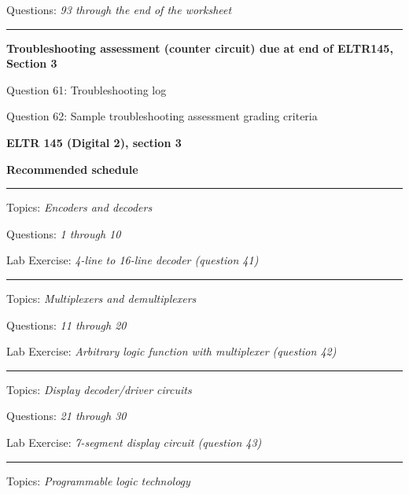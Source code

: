 \hskip 10pt Questions: {\it 93 through the end of the worksheet}
 
\vskip 10pt
\hrule \vskip 5pt
\noindent
{}

\hskip 10pt {\bf Troubleshooting assessment (counter circuit) due at end of ELTR145, Section 3}

\hskip 10pt Question 61: Troubleshooting log
 
\hskip 10pt Question 62: Sample troubleshooting assessment grading criteria
 
\vskip 10pt







\vfil \eject

\centerline{\bf ELTR 145 (Digital 2), section 3} \bigskip 
 
\vskip 10pt

\noindent
{\bf Recommended schedule}

\vskip 5pt

\hrule \vskip 5pt
\noindent
{}

\hskip 10pt Topics: {\it Encoders and decoders}
 
\hskip 10pt Questions: {\it 1 through 10}
 
\hskip 10pt Lab Exercise: {\it 4-line to 16-line decoder (question 41)}
 
\vskip 10pt
\hrule \vskip 5pt
\noindent
{}

\hskip 10pt Topics: {\it Multiplexers and demultiplexers}
 
\hskip 10pt Questions: {\it 11 through 20}
 
\hskip 10pt Lab Exercise: {\it Arbitrary logic function with multiplexer (question 42)}
 

\vskip 10pt
\hrule \vskip 5pt
\noindent
{}

\hskip 10pt Topics: {\it Display decoder/driver circuits}
 
\hskip 10pt Questions: {\it 21 through 30}
 
\hskip 10pt Lab Exercise: {\it 7-segment display circuit (question 43)}
 
\vskip 10pt
\hrule \vskip 5pt
\noindent
{}

\hskip 10pt Topics: {\it Programmable logic technology}
 
